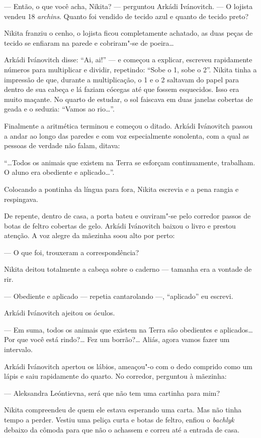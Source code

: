 --- Então, o que você acha, Nikita? --- perguntou Arkádi Ivánovitch. ---
O lojista vendeu 18 \emph{archins}. Quanto foi vendido de tecido azul e
quanto de tecido preto?

Nikita franziu o cenho, o lojista ficou completamente achatado, as duas
peças de tecido se enfiaram na parede e cobriram"-se de poeira\ldots{} 

Arkádi Ivánovitch disse: ``Ai, ai!'' --- e começou a explicar, escreveu
rapidamente números para multiplicar e dividir, repetindo: ``Sobe o 1,
sobe o 2''. Nikita tinha a impressão de que, durante a multiplicação, o
1 e o 2 saltavam do papel para dentro de sua cabeça e lá faziam cócegas
até que fossem esquecidos. Isso era muito maçante. No quarto de estudar,
o sol faiscava em duas janelas cobertas de geada e o seduzia: ``Vamos ao
rio\ldots{}''.

Finalmente a aritmética terminou e começou o ditado. Arkádi Ivánovitch
passou a andar ao longo das paredes e com voz especialmente sonolenta,
com a qual as pessoas de verdade não falam, ditava:

``\ldots{}Todos os animais que existem na Terra se esforçam continuamente,
trabalham. O aluno era obediente e aplicado\ldots{}''.

Colocando a pontinha da língua para fora, Nikita escrevia e a pena
rangia e respingava.

De repente, dentro de casa, a porta bateu e ouviram"-se pelo corredor
passos de botas de feltro cobertas de gelo. Arkádi Ivánovitch baixou o
livro e prestou atenção. A voz alegre da mãezinha soou alto por perto:

--- O que foi, trouxeram a correspondência?

Nikita deitou totalmente a cabeça sobre o caderno --- tamanha era a
vontade de rir.

--- Obediente e aplicado --- repetia cantarolando ---, ``aplicado'' eu
escrevi.

Arkádi Ivánovitch ajeitou os óculos.

--- Em suma, todos os animais que existem na Terra são obedientes e
aplicados\ldots{} Por que você está rindo?\ldots{} Fez um borrão?\ldots{} Aliás, agora
vamos fazer um intervalo.

Arkádi Ivánovitch apertou os lábios, ameaçou"-o com o dedo comprido como
um lápis e saiu rapidamente do quarto. No corredor, perguntou à
mãezinha:

--- Aleksandra Leóntievna, será que não tem uma cartinha para mim?

Nikita compreendeu de quem ele estava esperando uma carta. Mas não tinha
tempo a perder. Vestiu uma peliça curta e botas de feltro, enfiou o
\emph{bachlyk} debaixo da cômoda para que não o achassem e correu até a
entrada de casa.

